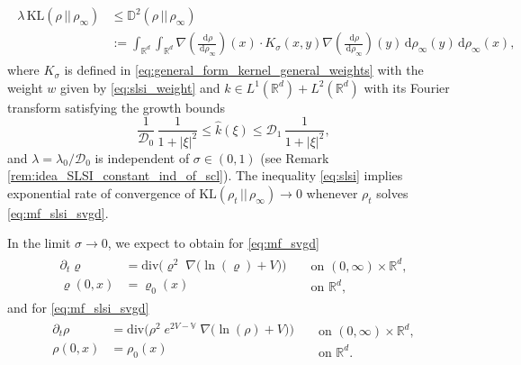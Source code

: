 \documentclass[reqno, 11pt]{amsart}
\numberwithin{equation}{section}
\theoremstyle{definition}
\begin{document}
    \begin{align}
        \label{eq:slsi}
        \begin{split}
            \lambda\, \mathrm{KL}(\rho\,||\,\rho_\infty)&\leq \mathbb{D}^2(\rho \,||\, \rho_\infty)\\
            &:=\int_{\mathbb{R}^{d}}\int_{\mathbb{R}^{d}}\nabla\left(\frac{\,\mathrm{d} \rho}{\,\mathrm{d} \rho_\infty}\right)(x)\cdot K_\sigma(x,y)\nabla\left(\frac{\,\mathrm{d} \rho}{\,\mathrm{d} \rho_\infty}\right)(y)\,\mathrm{d}\rho_\infty(y)\,\mathrm{d}\rho_\infty(x),
        \end{split}
        \tag{SLSI}
    \end{align}
    where $K_{\sigma}$ is defined in \eqref{eq:general_form_kernel_general_weights} with the weight $w$ given by \eqref{eq:slsi_weight} and $k\in L^1(\mathbb{R}^{d})+L^2(\mathbb{R}^{d})$ with its Fourier transform satisfying the growth bounds
    \begin{equation}\label{eq:fourier_bound_kernel_introduction}
        \frac{1}{\mathcal{D}_0}\,\frac{1}{1+|\xi|^2}\leq \widehat{k}(\xi)\leq \mathcal{D}_1\,\frac{1}{1+|\xi|^2},
    \end{equation}
    and $\lambda=\lambda_0/\mathcal{D}_0$ is independent of $\sigma \in (0,1)$ (see Remark \ref{rem:idea_SLSI_constant_ind_of_scl}). The inequality \eqref{eq:slsi} implies exponential rate of convergence of $\mathrm{KL}(\rho_t\,||\,\rho_\infty) \to 0$ whenever $\rho_t$ solves \eqref{eq:mf_slsi_svgd}.
    
    In the limit $\sigma \to 0$, we expect to obtain for \eqref{eq:mf_svgd}
    \begin{align}
        \label{eq:lim_mf_svgd}
        \begin{split}
            \partial_t \varrho&=\mathrm{div}\Big(\varrho^2\;  \nabla\big(\ln(\varrho)+V\big)\Big)\\
            \varrho(0,x) &= \varrho_0(x)
        \end{split}
        \begin{split}
            & \mbox{ on } (0,\infty) \times \mathbb{R}^{d}, \\
            &\mbox{ on }\mathbb{R}^{d},
        \end{split}
    \end{align}
    and for \eqref{eq:mf_slsi_svgd}
    \begin{align}
        \label{eq:lim_mf_slsi_svgd}
        \begin{split}
            \partial_t \rho&=\mathrm{div}\Big(\rho^2\; e^{2V-\mathbb{V}}\; \nabla\big(\ln(\rho)+V\big)\Big)\\
            \rho(0,x) &= \rho_0(x)
        \end{split}
        \begin{split}
            & \mbox{ on } (0,\infty) \times \mathbb{R}^{d}, \\
            &\mbox{ on }\mathbb{R}^{d}.
        \end{split}
    \end{align}
    
\end{document}
